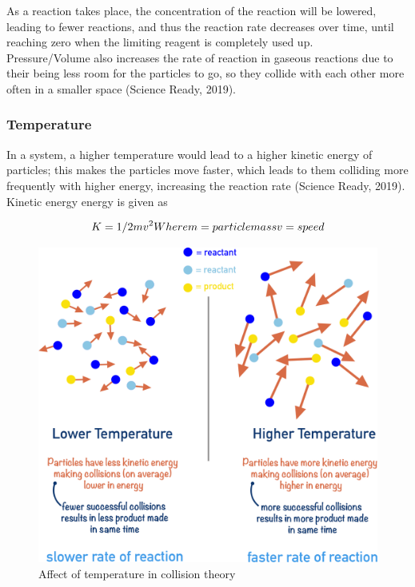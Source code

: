 \newpage

As a reaction takes place, the concentration of the reaction will be lowered, leading to fewer reactions, and thus the reaction rate decreases over time, until reaching zero when the limiting reagent is completely used up. \\
Pressure/Volume also increases the rate of reaction in gaseous reactions due to their being less room for the particles to go, so they collide with each other more often in a smaller space (Science Ready, 2019).

\subsubsection{Temperature}
In a system, a higher temperature would lead to a higher kinetic energy of particles; this makes the particles move faster, which leads to them colliding more frequently with higher energy, increasing the reaction rate (Science Ready, 2019).
Kinetic energy energy is given as

\begin{figure}[htp]
    \centering
    \[
         K = 1/2 mv^2 \\
        Where \\
        m = particle mass \\
        v  = speed
    \]
    \caption{}
    \label{fig:enter-label}
\end{figure}

\begin{figure}[htp]
    \centering
    \includegraphics[width=0.5\linewidth]{assets/8.png}
    \caption{Affect of temperature in collision theory}
    \label{fig:enter-label}
\end{figure}

